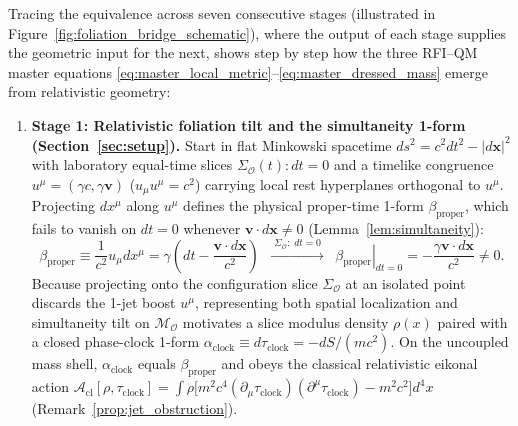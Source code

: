 \documentclass[11pt, a4paper]{article}
\theoremstyle{definition}
\begin{document}
Tracing the equivalence across seven consecutive stages (illustrated in Figure~\ref{fig:foliation_bridge_schematic}), where the output of each stage supplies the geometric input for the next, shows step by step how the three RFI--QM master equations \eqref{eq:master_local_metric}--\eqref{eq:master_dressed_mass} emerge from relativistic geometry:

\begin{enumerate}[label=\textbf{\arabic*.}, leftmargin=0.95cm, itemsep=0.55em]
    \item \textbf{Stage 1: Relativistic foliation tilt and the simultaneity 1-form (Section~\ref{sec:setup}).} Start in flat Minkowski spacetime $ds^2 = c^2 dt^2 - |d\mathbf{x}|^2$ with laboratory equal-time slices $\Sigma_{\mathcal{O}}(t): dt = 0$ and a timelike congruence $u^\mu = (\gamma c, \gamma\mathbf{v})$ ($u_\mu u^\mu = c^2$) carrying local rest hyperplanes orthogonal to $u^\mu$. Projecting $dx^\mu$ along $u^\mu$ defines the physical proper-time 1-form $\beta_{\text{proper}}$, which fails to vanish on $dt = 0$ whenever $\mathbf{v}\cdot d\mathbf{x} \neq 0$ (Lemma~\ref{lem:simultaneity}):
    \[
    \beta_{\text{proper}} \equiv \frac{1}{c^2}u_\mu dx^\mu = \gamma\!\left(dt - \frac{\mathbf{v}\cdot d\mathbf{x}}{c^2}\right)
    \;\;\xrightarrow{\;\Sigma_{\mathcal{O}}:\;dt=0\;}\;\;
    \left.\beta_{\text{proper}}\right|_{dt=0} = -\frac{\gamma\mathbf{v}\cdot d\mathbf{x}}{c^2} \neq 0.
    \]
    Because projecting onto the configuration slice $\Sigma_{\mathcal{O}}$ at an isolated point discards the 1-jet boost $u^\mu$, representing both spatial localization and simultaneity tilt on $\mathcal{M}_{\mathcal{O}}$ motivates a slice modulus density $\rho(x)$ paired with a closed phase-clock 1-form $\alpha_{\text{clock}} \equiv d\tau_{\text{clock}} = -dS/(mc^2)$. On the uncoupled mass shell, $\alpha_{\text{clock}}$ equals $\beta_{\text{proper}}$ and obeys the classical relativistic eikonal action $\mathcal{A}_{\text{cl}}[\rho, \tau_{\text{clock}}] = \int \rho\big[m^2 c^4(\partial_\mu\tau_{\text{clock}})(\partial^\mu\tau_{\text{clock}}) - m^2 c^2\big]d^4x$ (Remark~\ref{prop:jet_obstruction}).


\end{enumerate}
\end{document}
